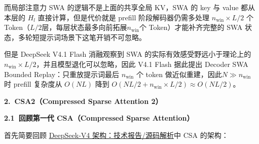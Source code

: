 \documentclass[zihao=false,fontset=windows]{ctexart}
\begin{document}
而局部注意力 SWA 的逻辑不是上面的共享全局 KV，SWA 的 key 与 value 都从本层的 $H_l$ 直接计算，但是代价就是 prefill 阶段解码器仍需多处理 $n_{\mathrm{win}}\times L/2$ 个 Token（$L/2$层，每层状态最多向前拓展$n_{\mathrm{win}}$个 Token）才能补齐完整的 SWA 状态，多轮短提示词场景下这笔开销不可忽略。\par

但是 DeepSeek V4.1 Flash 消融观察到 SWA 的实际有效感受野远小于理论上的 $n_{\mathrm{win}}\times L/2$，并且模型退化可以忽略，因此 V4.1 Flash 据此提出 Decoder SWA Bounded Replay：只重放提示词最后 $n_{\mathrm{win}}$ 个 token 做近似重建，因此$N\gg n_{\mathrm{win}}$ 时 prefill 复杂度从 $O(NL)$ 降到 $O(NL/2+n_{\mathrm{win}}\times L/2)\approx O(NL/2)$。\par


\par{}\vspace{0.8em}\noindent \begin{tcolorbox}[boxrule=0pt,arc=3pt,colback=callRed,left=3pt,right=3pt,top=2pt,bottom=2pt,before skip=0pt,after skip=0pt]{\bfseries \textcolor{feishuBlue}{2.}\ CSA2（Compressed Sparse Attention 2）}\end{tcolorbox}\par\vspace{0.28em}

\par{}\vspace{0.8em}\noindent \begin{tcolorbox}[boxrule=0pt,arc=3pt,colback=callOrange,left=3pt,right=3pt,top=2pt,bottom=2pt,before skip=0pt,after skip=0pt]{\bfseries \textcolor{feishuBlue}{2.1}\ 回顾第一代 CSA（Compressed Sparse Attention）}\end{tcolorbox}\par\vspace{0.28em}

首先简要回顾 \href{https://my.feishu.cn/wiki/UsuawakRYiqacxkD9vxcKzylnoe}{DeepSeek-V4 架构：技术报告/源码解析}中 CSA 的架构：\par
\end{document}

